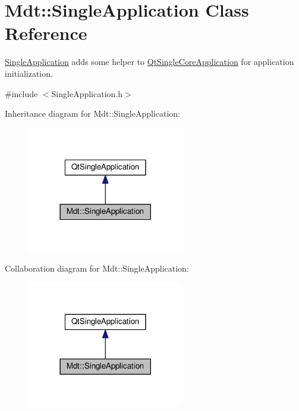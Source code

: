 \hypertarget{class_mdt_1_1_single_application}{}\section{Mdt\+:\+:Single\+Application Class Reference}
\label{class_mdt_1_1_single_application}


\hyperlink{class_mdt_1_1_single_application}{Single\+Application} adds some helper to \hyperlink{class_qt_single_core_application}{Qt\+Single\+Core\+Application} for application initialization.  




{\ttfamily \#include $<$Single\+Application.\+h$>$}



Inheritance diagram for Mdt\+:\+:Single\+Application\+:\nopagebreak
\begin{figure}[H]
\begin{center}
\leavevmode
\includegraphics[width=194pt]{class_mdt_1_1_single_application__inherit__graph}
\end{center}
\end{figure}


Collaboration diagram for Mdt\+:\+:Single\+Application\+:\nopagebreak
\begin{figure}[H]
\begin{center}
\leavevmode
\includegraphics[width=194pt]{class_mdt_1_1_single_application__coll__graph}
\end{center}
\end{figure}
